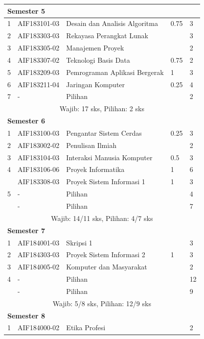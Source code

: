\documentclass[a4paper,twoside]{article}
\begin{document}
\begin{enumerate}
\begin{enumerate}
\begin{table}[H]
\begin{tabular}{|p{0.5cm}|p{2.85cm}|p{4.95cm}|p{2.7cm}|p{2.7cm}|}
					\multicolumn{5}{|l|}{\textbf{Semester 5}} \\ \hline
					1 &	AIF183101-03 &	Desain dan Analisis Algoritma &	0.75 &	3  \\ \hline
					2	& AIF183303-03 &	Rekayasa Perangkat Lunak &  &	3  \\ \hline
					3	& AIF183305-02 &	Manajemen Proyek &  &	2  \\ \hline
					4 &	AIF183307-02 &	Teknologi Basis Data &	0.75 &	2  \\ \hline
					5 &	AIF183209-03 &	Pemrograman Aplikasi Bergerak &	1 &	3 \\ \hline
					6 &	AIF183211-04 &	Jaringan Komputer &	0.25 &	4  \\ \hline
					7 &	- &	Pilihan &	&	2  \\ \hline
					\multicolumn{5}{|c|}{Wajib: 17 sks, Pilihan: 2 sks} \\ \hline
					\multicolumn{5}{|l|}{\textbf{Semester 6}} \\ \hline
					1	& AIF183100-03 &	Pengantar Sistem Cerdas &	0.25 &	3  \\ \hline
					2	& AIF183002-02 &	Penulisan Ilmiah &  &	2  \\ \hline
					3	& AIF183104-03 &	Interaksi Manusia Komputer &	0.5 &	3  \\ \hline
					4	& AIF183106-06 &	Proyek Informatika &	1 &	6 \\ \hline
						& AIF183308-03 &	Proyek Sistem Informasi 1	& 1 &	3  \\ \hline
					5	& - &	Pilihan &	&	4  \\ \hline
						& - &	Pilihan	& &	7  \\ \hline
					\multicolumn{5}{|c|}{Wajib: 14/11 sks, Pilihan: 4/7 sks} \\ \hline
					\multicolumn{5}{|l|}{\textbf{Semester 7}} \\ \hline
					1	& AIF184001-03	& Skripsi 1	& &	3  \\ \hline
					2	& AIF184303-03	& Proyek Sistem Informasi 2 &	1 &	3  \\ \hline
					3	& AIF184005-02	& Komputer dan Masyarakat &	&	2  \\ \hline
					4	& - &	Pilihan	& &	12  \\ \hline
						& - &	Pilihan	& &	9  \\ \hline
					\multicolumn{5}{|c|}{Wajib: 5/8 sks, Pilihan: 12/9 sks} \\ \hline
					\multicolumn{5}{|l|}{\textbf{Semester 8}} \\ \hline
					1 &	AIF184000-02 &	Etika Profesi &	&	2  \\ \hline

\end{tabular}
\end{table}
\end{enumerate}
\end{enumerate}
\end{document}
